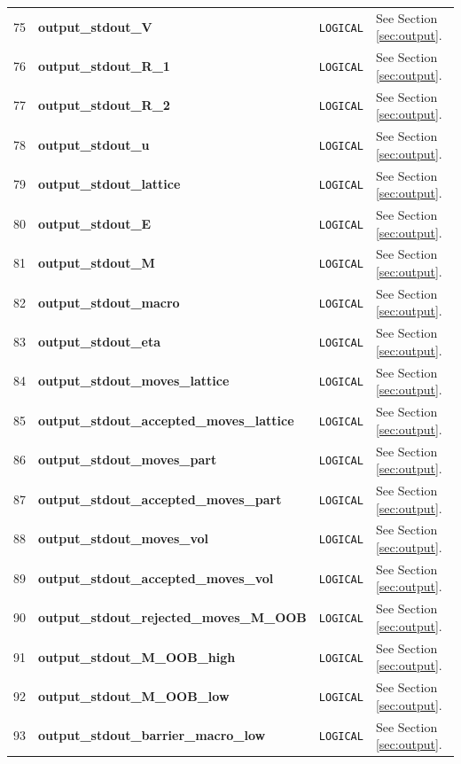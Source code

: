 \documentclass{report}
\begin{document}
\begin{landscape}
\begin{center}
\begin{longtable}{l l l p{8cm}}
75 & \textbf{output\_stdout\_V}  &  \texttt{LOGICAL}  & See Section \ref{sec:output}. \\
76 & \textbf{output\_stdout\_R\_1}  &  \texttt{LOGICAL}  & See Section \ref{sec:output}. \\
77 & \textbf{output\_stdout\_R\_2}  &  \texttt{LOGICAL}  & See Section \ref{sec:output}. \\
78 & \textbf{output\_stdout\_u}  &  \texttt{LOGICAL}  & See Section \ref{sec:output}. \\
79 & \textbf{output\_stdout\_lattice}  &  \texttt{LOGICAL}  & See Section \ref{sec:output}. \\
80 & \textbf{output\_stdout\_E}  &  \texttt{LOGICAL}  & See Section \ref{sec:output}. \\
81 & \textbf{output\_stdout\_M}  &  \texttt{LOGICAL}  & See Section \ref{sec:output}. \\
82 & \textbf{output\_stdout\_macro}  &  \texttt{LOGICAL}  & See Section \ref{sec:output}. \\
83 & \textbf{output\_stdout\_eta}  &  \texttt{LOGICAL}  & See Section \ref{sec:output}. \\
84 & \textbf{output\_stdout\_moves\_lattice}  &  \texttt{LOGICAL}  & See Section \ref{sec:output}. \\
85 & \textbf{output\_stdout\_accepted\_moves\_lattice}  &  \texttt{LOGICAL}  & See Section \ref{sec:output}. \\
86 & \textbf{output\_stdout\_moves\_part}  &  \texttt{LOGICAL}  & See Section \ref{sec:output}. \\
87 & \textbf{output\_stdout\_accepted\_moves\_part}  &  \texttt{LOGICAL}  & See Section \ref{sec:output}. \\
88 & \textbf{output\_stdout\_moves\_vol}  &  \texttt{LOGICAL}  & See Section \ref{sec:output}. \\
89 & \textbf{output\_stdout\_accepted\_moves\_vol}  &  \texttt{LOGICAL}  & See Section \ref{sec:output}. \\
90 & \textbf{output\_stdout\_rejected\_moves\_M\_OOB}  &  \texttt{LOGICAL}  & See Section \ref{sec:output}. \\
91 & \textbf{output\_stdout\_M\_OOB\_high}  &  \texttt{LOGICAL}  & See Section \ref{sec:output}. \\
92 & \textbf{output\_stdout\_M\_OOB\_low}  &  \texttt{LOGICAL}  & See Section \ref{sec:output}. \\
93 & \textbf{output\_stdout\_barrier\_macro\_low}  &  \texttt{LOGICAL}  & See Section \ref{sec:output}. \\

\end{longtable}
\end{center}
\end{landscape}
\end{document}
